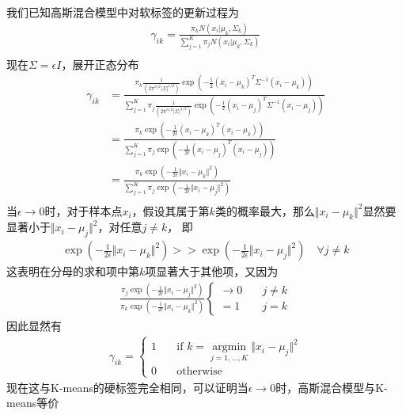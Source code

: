 \documentclass[12pt, a4paper]{article}
\begin{document}
我们已知高斯混合模型中对软标签的更新过程为
\begin{align*}
    \gamma_{ik}=\frac{\pi_k N(x_i\vert\mu_k,\Sigma_k)}{\sum_{j=1}^K \pi_j N(x_i\vert\mu_k,\Sigma_k)}\\
\end{align*}
现在$\Sigma=\epsilon I$，展开正态分布
\begin{align*}
    \gamma_{ik}&=\frac{\pi_k \frac{1}{(2\pi^{n/2}\vert\Sigma\vert^{1/2})}
    \exp(-\frac{1}{2}(x_i-\mu_k)^T\Sigma^{-1}(x_i-\mu_k))}
    {\sum_{j=1}^K \pi_j \frac{1}{(2\pi^{n/2}\vert\Sigma\vert^{1/2})}
    \exp(-\frac{1}{2}(x_i-\mu_j)^T\Sigma^{-1}(x_i-\mu_j))}\\
    &=\frac{\pi_k\exp(-\frac{1}{2\epsilon}(x_i-\mu_k)^T(x_i-\mu_k))}
    {\sum_{j=1}^{K}\pi_j\exp(-\frac{1}{2\epsilon}(x_i-\mu_j)^T(x_i-\mu_j))}\\
    &=\frac{\pi_k\exp(-\frac{1}{2\epsilon}\Vert x_i-\mu_k\Vert^2)}
    {\sum_{j=1}^{K}\pi_j\exp(-\frac{1}{2\epsilon}\Vert x_i-\mu_j\Vert^2)}\\
\end{align*}
当$\epsilon\rightarrow0$时，对于样本点$x_i$，假设其属于第$k$类的概率最大，那么$\Vert x_i-\mu_k\Vert^2$显然要显著小于$\Vert x_i-\mu_j\Vert^2$，对任意$j\neq k$，
即
\begin{align*}
    \exp(-\frac{1}{2\epsilon}\Vert x_i-\mu_k\Vert^2)>>\exp(-\frac{1}{2\epsilon}\Vert x_i-\mu_j\Vert^2)
    \quad \forall j\neq k
\end{align*}
这表明在分母的求和项中第$k$项显著大于其他项，又因为
\begin{align*}
    \frac{\pi_j\exp(-\frac{1}{2\epsilon}\Vert x_i-\mu_j\Vert^2)}{\pi_k\exp(-\frac{1}{2\epsilon}\Vert x_i-\mu_k\Vert^2)}\left\{
        \begin{aligned}
            \rightarrow0 & \quad j\neq k\\
            =1 & \quad j=k
        \end{aligned}
    \right.
\end{align*}
因此显然有
\begin{align*}
    \gamma_{ik}=\left\{
        \begin{aligned}
            1 & \quad\text{if }k=\mathop{argmin}\limits_{j=1,\dots,K}\Vert x_i-\mu_j \Vert^2\\
            0 & \quad\text{otherwise}
        \end{aligned}
    \right.
\end{align*}
现在这与K-means的硬标签完全相同，可以证明当$\epsilon\rightarrow0$时，高斯混合模型与K-means等价
\end{document}

